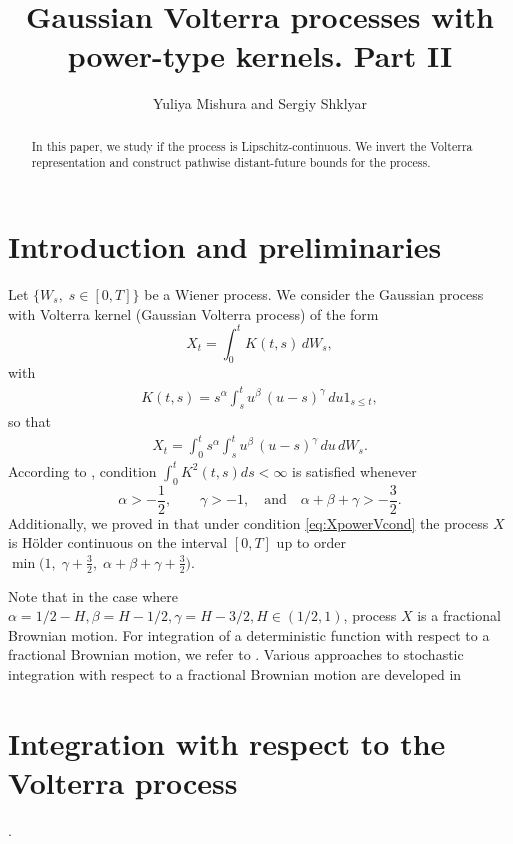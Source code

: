 \documentclass{article}
\title{Gaussian Volterra processes with power-type kernels. Part II}
\author{Yuliya Mishura and Sergiy Shklyar}
\theoremstyle{plain}
\theoremstyle{remark}
\theoremstyle{definition}
\begin{document}
\maketitle
\begin{abstract}
	
	In this paper, we study if the process is Lipschitz-continuous.
	We invert the Volterra representation
	and construct pathwise distant-future bounds for the process.
\end{abstract}

\section{Introduction and preliminaries}
Let $\{W_s,\;s\in[0,T]\}$ be a Wiener process.
We consider the Gaussian process with Volterra kernel (Gaussian Volterra process)
of the form
\begin{equation}\label{eq:VolterraPr}
X_t = \int_0^t K(t,s) \, dW_s,
\end{equation}
with
\begin{gather}
K(t,s) = s^\alpha \int_s^t u^\beta \, (u-s)^\gamma \, du 1_{s\le t},
\label{eq:KpowerV}
\end{gather}
so that \begin{gather}
X_t = \int_0^t s^\alpha \int_s^t u^\beta \, (u-s)^\gamma \, du \, dW_s.
\label{eq:XpowerV}
\end{gather}
According to \cite{Part 1}, condition $\int_0^tK^2(t,s)ds<\infty$ is   satisfied whenever
\begin{equation}
	\label{eq:XpowerVcond}
\alpha>-\frac12, \qquad
\gamma>-1, \quad \mbox{and} \quad
\alpha+\beta+\gamma > -\frac32.
\end{equation}
Additionally,   we proved in  \cite{Part 1} that under
condition \eqref{eq:XpowerVcond}
the process $X$
is H\"older continuous on the interval $[0,T]$
up to order $\min\bigl(1, \; \allowbreak
\gamma+\frac32, \; \allowbreak
\alpha+\beta+\gamma+\frac32\bigr)$.

Note that in the case where $\alpha=1/2-H, \beta=H-1/2, \gamma=H-3/2, H\in(1/2,1)$, process $X$ is a fractional Brownian motion.
For integration of a deterministic function
with respect to a fractional Brownian motion,
we refer to \cite{PapirasTaqqu2001}.
Various approaches to
stochastic integration with respect to a fractional
Brownian motion are developed in \cite{Biagini2008,Nualart2006}




\section{Integration with respect to the Volterra
process}
.
\end{document}
